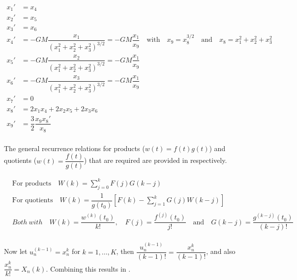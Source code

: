 \begin{equation} \label{eq:first_deri}
\begin{split}
x_{1}'&=x_{4}\\
x_{2}'&=x_{5}\\
x_{3}'&=x_{6}\\
x_{4}'&=-GM\dfrac{x_{1}}{\left(x_{1}^{2}+x_{2}^{2}+x_{3}^{2} \right)^{3/2}}=-GM\dfrac{x_{1}}{x_{9}} \quad \text{with} \quad x_{9}=x_{8}^{3/2} \quad \text{and} \quad x_{8}=x_{1}^{2}+x_{2}^{2}+x_{3}^{2}\\
x_{5}'&=-GM\dfrac{x_{2}}{\left(x_{1}^{2}+x_{2}^{2}+x_{3}^{2} \right)^{3/2}}=-GM\dfrac{x_{1}}{x_{9}}\\
x_{6}'&=-GM\dfrac{x_{3}}{\left(x_{1}^{2}+x_{2}^{2}+x_{3}^{2} \right)^{3/2}}=-GM\dfrac{x_{1}}{x_{9}}\\
x_{7}'&=0\\
x_{8}'&=2x_{1}x_{4}+2x_{2}x_{5}+2x_{3}x_{6}\\
x_{9}'&=\dfrac{3}{2}\dfrac{x_{9}x_{8}'}{x_{8}}\\
\end{split}
\end{equation}

The general recurrence relations for products ($w\left(t\right)=f\left(t\right)g\left(t\right)$) and quotients ($w\left(t\right)=\dfrac{f\left(t\right)}{g\left(t\right)}$) that are required are provided in  respectively.

\begin{equation} \label{eq:rec_rel}
\begin{split}
&\text{For products} \quad W\left(k\right)=\displaystyle\sum_{j=0}^{k}F\left(j\right)G\left(k-j\right)\\
&\text{For quotients} \quad W\left(k\right)=\dfrac{1}{g\left(t_{0}\right)}\left[F\left(k\right)-\displaystyle\sum_{j=1}^{k} G\left(j\right)W\left(k-j\right)\right]\\
& Both \ with \quad W\left(k\right)=\dfrac{w^{\left(k\right)}\left(t_{0}\right)}{k!}, \quad F\left(j\right)=\dfrac{f^{\left(j\right)}\left(t_{0}\right)}{j!} \quad \text{and} \quad G\left(k-j\right)=\dfrac{g^{\left(k-j\right)}\left(t_{0}\right)}{\left(k-j\right)!}\\
\end{split}
\end{equation}


Now let $u_{n}^{\left(k-1\right)}=x_{n}^{k}$ for $k=1,\dots,K$, then $\dfrac{u_{n}^{\left(k-1\right)}}{\left(k-1\right)!}=\dfrac{x_{n}^{k}}{\left(k-1\right)!}$, and also $\dfrac{x_{n}^{k}}{k!}=X_{n}\left(k\right)$. Combining this results in .

